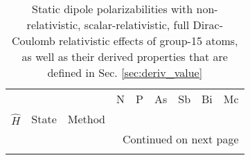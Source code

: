 \begin{longtable}{lllllllll}
\caption{Static dipole polarizabilities with non-relativistic, scalar-relativistic, full Dirac-Coulomb relativistic effects of group-15 atoms, as well as their derived properties that are defined in Sec. \ref{sec:deriv_value}}\label{tab:dipole_group_15}\\
\toprule
      &         &                                 &            N &           P &        As &        Sb &        Bi &           Mc \\
$\hat{H}$ & State & Method &              &             &           &           &           &              \\
\midrule
\endhead
\midrule
\multicolumn{9}{r}{{Continued on next page}} \\
\midrule
\endfoot


\end{longtable}

